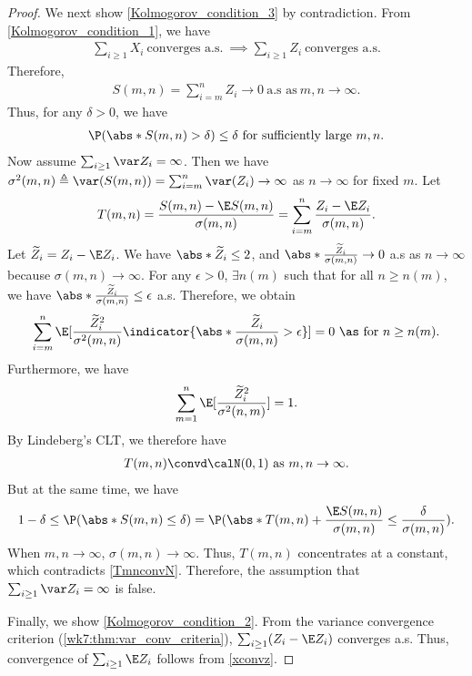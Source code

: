 \documentclass[../aipt.tex]{subfiles}
\begin{document}
\begin{proof}
We next show \cref{Kolmogorov_condition_3} by contradiction. From \cref{Kolmogorov_condition_1}, we have
\begin{align}\label{xconvz}
\sum_{i \geq 1}X_i \ \text{converges a.s.}\ \implies \sum_{i \geq 1}Z_i \ \text{converges a.s.}
\end{align}
Therefore, 
\begin{align*}
S(m,n) = \sum_{i=m}^n Z_i \to 0 \ \text{a.s as}\ m, n \to \infty. 
\end{align*}
Thus, for any $\delta > 0$, we have 
\begin{align} \label{Kolmogorov_intmd_ineq}
\P(\abs*{S(m,n)} > \delta) \leq \delta \ \text{for sufficiently large}\ m, n.
\end{align} 
Now assume $\sum_{i \geq 1} \var Z_i = \infty$. Then we have $\sigma^2(m,n) \triangleq \var(S(m,n)) = \sum_{i=m}^n \var(Z_i) \to \infty$ as $n \to \infty$ for fixed $m$. Let
\begin{align*}
T(m,n) 
= \frac{S(m,n) - \E S(m,n)}{\sigma(m,n)}
= \sum_{i=m}^n \frac{Z_i - \E Z_i}{\sigma(m,n)}.
\end{align*}
Let $\widetilde{Z}_i = Z_i - \E Z_i$. We have $\abs*{\widetilde{Z}_i} \leq 2$, and $\abs*{\frac{\widetilde{Z}_i}{\sigma(m,n)}} \to 0$ a.s as $n \to \infty$ because $\sigma(m,n) \to \infty$. For any $\epsilon>0$, $\exists n(m)$ such that for all $n \geq n(m)$, we have $\abs*{\frac{\widetilde{Z}_i}{\sigma(m,n)}} \leq \epsilon$ a.s. Therefore, we obtain
\begin{align*}
\sum_{i=m}^n \E[\frac{\widetilde{Z}_i^2}{\sigma^2(m,n)} \indicator{\abs*{\frac{\widetilde{Z}_i}{\sigma(m,n)}} > \epsilon}] = 0\ \as \text{ for}\ n \geq n(m).
\end{align*}
Furthermore, we have 
\begin{align*}
\sum_{m=1}^n \E[\frac{\widetilde{Z}_i^2}{\sigma^2(n,m)}] = 1.
\end{align*}
By Lindeberg's CLT, we therefore have
\begin{align}
T(m,n) \convd \calN (0,1) \ \text{as}\ m,n \to \infty.\label{TmnconvN}
\end{align}
But at the same time, we have
\begin{align*}
1-\delta \leq \P(\abs*{S(m,n)} \leq \delta) = \P(\abs*{T(m,n) + \frac{\E S(m,n)}{\sigma(m,n)}} \leq \frac{\delta}{\sigma(m,n)}).
\end{align*}
When $m, n \to \infty$, $\sigma(m,n) \to \infty$. Thus, $T(m,n)$ concentrates at a constant, which contradicts \cref{TmnconvN}. Therefore, the assumption that $\sum_{i \geq 1} \var Z_i = \infty$ is false.

Finally, we show \cref{Kolmogorov_condition_2}. From the variance convergence criterion (\cref{wk7:thm:var_conv_criteria}), $\sum_{i \geq 1}(Z_i - \E Z_i)$ converges a.s. Thus, convergence of $\sum_{i \geq 1} \E Z_i$ follows from \cref{xconvz}.
\end{proof}
\end{document}
